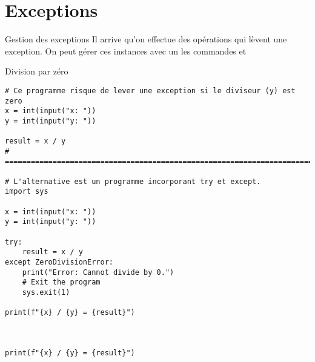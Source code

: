\documentclass{report}
\begin{document}
\section{Exceptions}
\begin{Syntaxe*}{Gestion des exceptions}{}
Il arrive qu'on effectue des opérations qui lèvent une exception. On peut gérer ces instances avec un les commandes  et  
\end{Syntaxe*}
\begin{EExample*}{Division par zéro}{}
\begin{lstlisting}[style=PythonDraculaWhite]
# Ce programme risque de lever une exception si le diviseur (y) est zero
x = int(input("x: "))
y = int(input("y: "))

result = x / y
# =================================================================================

# L'alternative est un programme incorporant try et except.
import sys

x = int(input("x: "))
y = int(input("y: "))

try:
    result = x / y
except ZeroDivisionError:
    print("Error: Cannot divide by 0.")
    # Exit the program
    sys.exit(1)

print(f"{x} / {y} = {result}")



print(f"{x} / {y} = {result}")
\end{lstlisting}
\end{EExample*}
\end{document}
